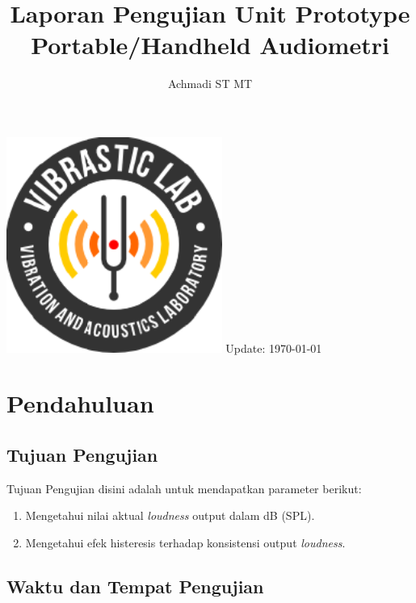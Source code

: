 \documentclass[12pt,]{article}
\title{\LARGE \bf
	Laporan Pengujian Unit Prototype Portable/Handheld Audiometri\\
}
\author{Achmadi ST MT}
\date{}
\begin{document}
	\thispagestyle{empty}
	
	\begin{titlepage}
		\centering
		\vfill
		\vfill
		\maketitle
		\vfill
		\includegraphics[width=200pt]{images/logo/logoviblab}
		\vfill
		\vfill
		Update: {\today} \currenttime \\
	\end{titlepage}
	
	
	\newpage
	\tableofcontents
	
	
	\newpage
	\section{Pendahuluan}
	
	\subsection{Tujuan Pengujian}
	
	Tujuan Pengujian disini adalah untuk mendapatkan parameter berikut:
	\begin{enumerate}
		\item Mengetahui nilai aktual \textit{loudness} output dalam dB (SPL).
		\item Mengetahui efek histeresis terhadap konsistensi output \textit{loudness}.
	\end{enumerate}

	\subsection{Waktu dan Tempat Pengujian}
	
\end{document}
